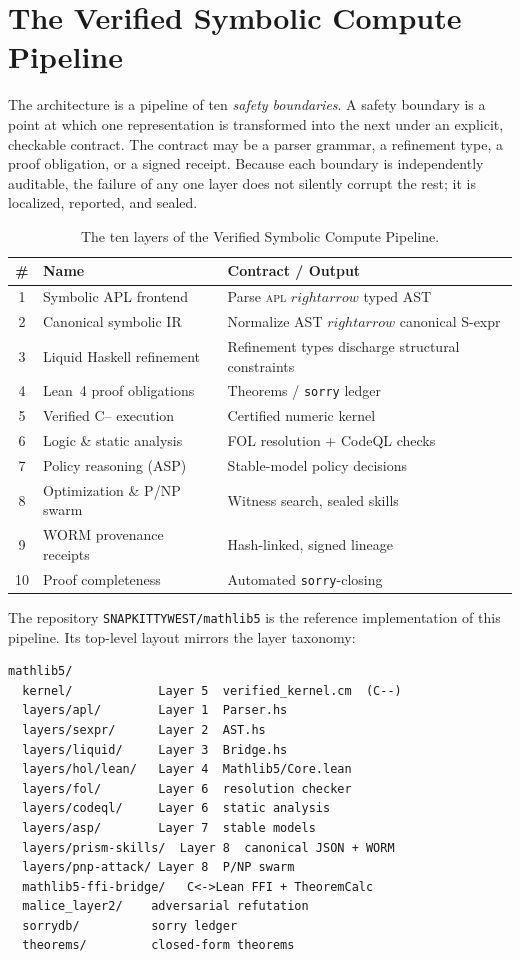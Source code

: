 \section{The Verified Symbolic Compute Pipeline}
\label{sec:intro-vscp}

The architecture is a pipeline of ten \emph{safety boundaries}. A safety
boundary is a point at which one representation is transformed into the next
under an explicit, checkable contract. The contract may be a parser grammar,
a refinement type, a proof obligation, or a signed receipt. Because each
boundary is independently auditable, the failure of any one layer does not
silently corrupt the rest; it is localized, reported, and sealed.

\begin{table}[H]
\centering
\caption{The ten layers of the Verified Symbolic Compute Pipeline.}
\label{tab:layers}
\begin{tabularx}{\textwidth}{clX}
\toprule
\textbf{\#} & \textbf{Name} & \textbf{Contract / Output} \\
\midrule
1  & Symbolic APL frontend      & Parse \textsc{apl} $\ensuremath{rightarrow}$ typed AST \\
2  & Canonical symbolic IR      & Normalize AST $\ensuremath{rightarrow}$ canonical S-expr \\
3  & Liquid Haskell refinement  & Refinement types discharge structural constraints \\
4  & Lean~4 proof obligations   & Theorems / \texttt{sorry} ledger \\
5  & Verified C{--} execution   & Certified numeric kernel \\
6  & Logic \& static analysis   & FOL resolution + CodeQL checks \\
7  & Policy reasoning (ASP)     & Stable-model policy decisions \\
8  & Optimization \& P/NP swarm & Witness search, sealed skills \\
9  & WORM provenance receipts   & Hash-linked, signed lineage \\
10 & Proof completeness         & Automated \texttt{sorry}-closing \\
\bottomrule
\end{tabularx}
\end{table}

The repository \texttt{SNAPKITTYWEST/mathlib5} is the reference implementation
of this pipeline. Its top-level layout mirrors the layer taxonomy:

\begin{verbatim}
mathlib5/
  kernel/            Layer 5  verified_kernel.cm  (C--)
  layers/apl/        Layer 1  Parser.hs
  layers/sexpr/      Layer 2  AST.hs
  layers/liquid/     Layer 3  Bridge.hs
  layers/hol/lean/   Layer 4  Mathlib5/Core.lean
  layers/fol/        Layer 6  resolution checker
  layers/codeql/     Layer 6  static analysis
  layers/asp/        Layer 7  stable models
  layers/prism-skills/  Layer 8  canonical JSON + WORM
  layers/pnp-attack/ Layer 8  P/NP swarm
  mathlib5-ffi-bridge/   C<->Lean FFI + TheoremCalc
  malice_layer2/    adversarial refutation
  sorrydb/          sorry ledger
  theorems/         closed-form theorems
\end{verbatim}

